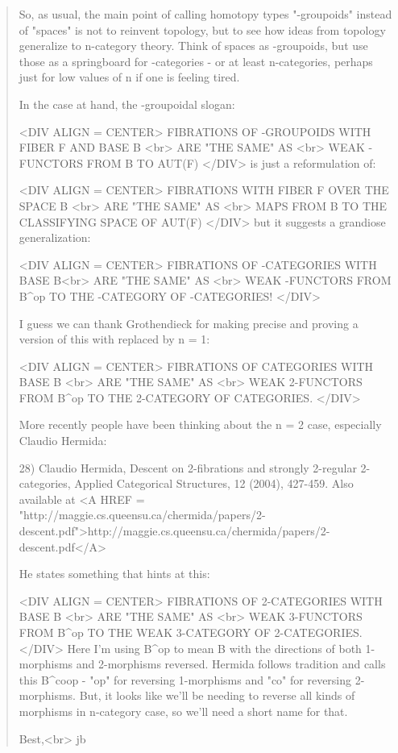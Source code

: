 \begin{quote}
 So, as usual, the main point of calling homotopy types 
 "\omega -groupoids"
 instead of "spaces" 
 is not to reinvent topology, but to see how ideas
 from topology generalize to n-category theory.  Think of spaces as 
 \omega -groupoids, but use those as a springboard for \omega -categories -
 or at least n-categories, perhaps just for low values of n if one is 
 feeling tired.

 In the case at hand, the \omega -groupoidal slogan: 

<DIV ALIGN = CENTER>
               FIBRATIONS OF \omega -GROUPOIDS WITH FIBER F AND BASE B <br>
                               ARE "THE SAME" AS <br>
                       WEAK \omega -FUNCTORS FROM B TO AUT(F)
</DIV>
 is just a reformulation of:

<DIV ALIGN = CENTER>
                  FIBRATIONS WITH FIBER F OVER THE SPACE B <br>
                             ARE "THE SAME" AS <br>
                 MAPS FROM B TO THE CLASSIFYING SPACE OF AUT(F)
</DIV>
 but it suggests a grandiose generalization:

<DIV ALIGN = CENTER>
               FIBRATIONS OF \omega -CATEGORIES WITH BASE B<br>
                            ARE "THE SAME" AS <br>
   WEAK \omega -FUNCTORS FROM B^{op} TO THE \omega -CATEGORY OF \omega -CATEGORIES!
</DIV>

 I guess we can thank Grothendieck for making precise and proving a
 version of this with \omega  replaced by n = 1:

<DIV ALIGN = CENTER>
                      FIBRATIONS OF CATEGORIES WITH BASE B <br>
                               ARE "THE SAME" AS <br>
            WEAK 2-FUNCTORS FROM B^{op} TO THE 2-CATEGORY OF CATEGORIES.
</DIV>

 More recently people have been thinking about the n = 2 case, especially
 Claudio Hermida:

 28) Claudio Hermida, Descent on 2-fibrations and strongly 2-regular 
 2-categories, Applied Categorical Structures, 12 (2004), 427-459.
 Also available at <A HREF = "http://maggie.cs.queensu.ca/chermida/papers/2-descent.pdf">http://maggie.cs.queensu.ca/chermida/papers/2-descent.pdf</A>

 He states something that hints at this:

<DIV ALIGN = CENTER>
                      FIBRATIONS OF 2-CATEGORIES WITH BASE B <br>
                               ARE "THE SAME" AS <br>
         WEAK 3-FUNCTORS FROM B^{op} TO THE WEAK 3-CATEGORY OF 2-CATEGORIES.
</DIV>
 Here I'm using B^{op} to mean B with the directions of 
 both 1-morphisms and 2-morphisms reversed.  
 Hermida follows tradition and calls this B^{coop} - 
 "op" for reversing 
 1-morphisms and "co" for reversing 2-morphisms.  
 But, it looks like we'll 
 be needing to reverse all kinds of morphisms in n-category case, so we'll 
 need a short name for that.

 Best,<br>
 jb
\end{quote}

